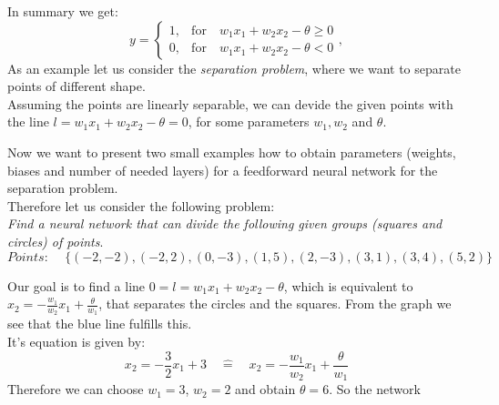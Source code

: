 In summary we get:
\[ y = \begin{cases}
1, &\text{for} \quad w_1x_1+w_2x_2-\theta\geq0 \\
0, &\text{for} \quad w_1x_1+w_2x_2-\theta < 0
\end{cases}, \]
As an example let us consider the \emph{separation problem}, where we want to separate points of different shape.\\
Assuming the points are linearly separable, we can devide the given points with the line $l=w_1x_1+w_2x_2-\theta=0$, for some parameters $w_1,w_2$ and $\theta$.

Now we want to present two small examples how to obtain parameters (weights, biases and number of needed layers) for a feedforward neural network for the separation problem.\\
Therefore let us consider the following problem:\\
\textit{Find a neural network that can divide the following given groups (squares and circles) of points}.
\[ \textit{Points: }\quad \{ (-2,-2),(-2,2),(0,-3),(1,5),(2,-3),(3,1),(3,4),(5,2) \} \]
\begin{figure}[H]
\centering
{}
\end{figure} \FigureHSpace
Our goal is to find a line $0=l=w_1x_1+w_2x_2-\theta$, which is equivalent to $x_2=-\frac{w_1}{w_2}x_1 + \frac{\theta}{w_1}$, that separates the circles and the squares. From the graph we see that the blue line fulfills this.\\
It's equation is given by:
\[ x_2 = -\frac{3}{2}x_1 + 3 \quad \widehat{=} \quad x_2=-\frac{w_1}{w_2}x_1 + \frac{\theta}{w_1} \]
Therefore we can choose $w_1=3$, $w_2=2$ and obtain $\theta=6$. So the network
